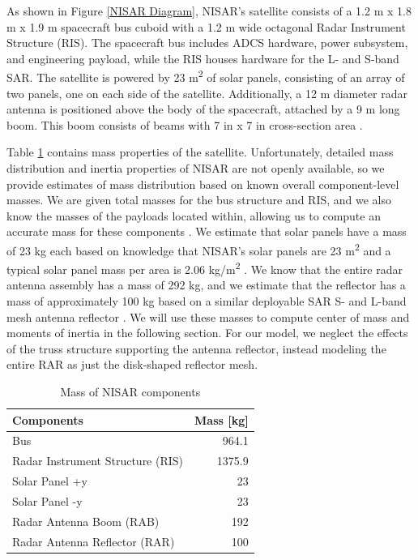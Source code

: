 As shown in Figure \ref{NISAR Diagram}, NISAR's satellite consists of a 1.2 m x 1.8 m x 1.9 m spacecraft bus cuboid with a 1.2 m wide octagonal Radar Instrument Structure (RIS). The spacecraft bus includes ADCS hardware, power subsystem, and engineering payload, while the RIS houses hardware for the L- and S-band SAR. The satellite is powered by 23 m\textsuperscript{2} of solar panels, consisting of an array of two panels, one on each side of the satellite. Additionally, a 12 m diameter radar antenna is positioned above the body of the spacecraft, attached by a 9 m long boom. This boom consists of beams with 7 in x 7 in cross-section area \cite{NISARMission}.

Table \ref{tab:mass} contains mass properties of the satellite. Unfortunately, detailed mass distribution and inertia properties of NISAR are not openly available, so we provide estimates of mass distribution based on known overall component-level masses. We are given total masses for the bus structure and RIS, and we also know the masses of the payloads located within, allowing us to compute an accurate mass for these components \cite{NISARMission}. We estimate that solar panels have a mass of 23 kg each based on knowledge that NISAR's solar panels are 23 m\textsuperscript{2} and a typical solar panel mass per area is 2.06 kg/m\textsuperscript{2} \cite{SolarPanelMass}. We know that the entire radar antenna assembly has a mass of 292 kg, and we estimate that the reflector has a mass of approximately 100 kg based on a similar deployable SAR S- and L-band mesh antenna reflector \cite{L3Harris}. We will use these masses to compute center of mass and moments of inertia in the following section. For our model, we neglect the effects of the truss structure supporting the antenna reflector, instead modeling the entire RAR as just the disk-shaped reflector mesh.

\begin{longtable}{l|r}
\caption{Mass of NISAR components}
\label{tab:mass}\\
\textbf{Components}              & \multicolumn{1}{l}{\textbf{Mass [kg]}} \\ \hline
\endfirsthead
%
\endhead
%
Bus                              & 964.1                                      \\
Radar Instrument Structure (RIS) & 1375.9                                     \\
Solar Panel +y                   & 23                                         \\
Solar Panel -y                   & 23                                         \\
Radar Antenna Boom (RAB)         & 192                                        \\
Radar Antenna Reflector (RAR)    & 100                                       
\end{longtable}

